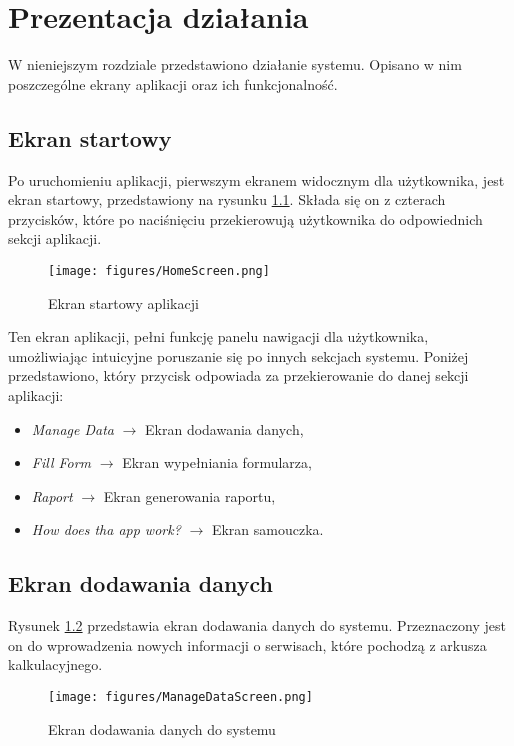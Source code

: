 \chapter{Prezentacja działania}

W nieniejszym rozdziale przedstawiono działanie systemu. Opisano w nim poszczególne ekrany aplikacji oraz ich funkcjonalność. 

\section{Ekran startowy}
Po uruchomieniu aplikacji, pierwszym ekranem widocznym dla użytkownika, jest ekran startowy, przedstawiony na rysunku \ref{fig:homescreen}. Składa się on z czterach przycisków, które po naciśnięciu przekierowują użytkownika do odpowiednich sekcji aplikacji.

 \begin{figure}[h]
     \centering
     \texttt{[image: figures/HomeScreen.png]}
     \caption{Ekran startowy aplikacji} 
     \label{fig:homescreen}
 \end{figure}

 Ten ekran aplikacji, pełni funkcję panelu nawigacji dla użytkownika, umożliwiając intuicyjne poruszanie się po innych sekcjach systemu.
Poniżej przedstawiono, który przycisk odpowiada za przekierowanie do danej sekcji aplikacji:
\begin{itemize}
    \item \emph{Manage Data} $\rightarrow$ Ekran dodawania danych,
    \item \emph{Fill Form} $\rightarrow$ Ekran wypełniania formularza,
    \item \emph{Raport} $\rightarrow$ Ekran generowania raportu,
    \item \emph{How does tha app work?} $\rightarrow$ Ekran samouczka.
\end{itemize}


 \section{Ekran dodawania danych}
 Rysunek \ref{fig:managedatascreen} przedstawia ekran dodawania danych do systemu. Przeznaczony jest on do wprowadzenia nowych informacji o serwisach, które pochodzą z arkusza kalkulacyjnego.
  \begin{figure}[H]
     \centering
     \texttt{[image: figures/ManageDataScreen.png]}
     \caption{Ekran dodawania danych do systemu} 
     \label{fig:managedatascreen}
 \end{figure}

